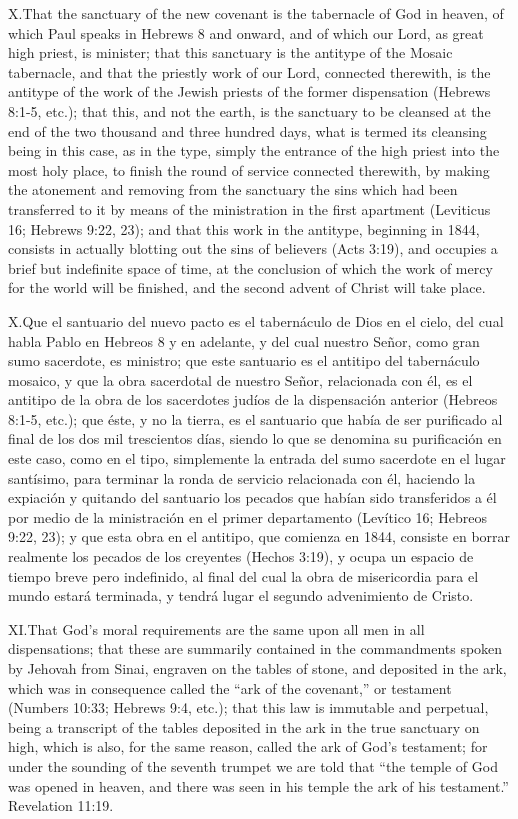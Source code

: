 \lettrine{X.} That the sanctuary of the new covenant is the tabernacle of God in heaven, of which Paul speaks in Hebrews 8 and onward, and of which our Lord, as great high priest, is minister; that this sanctuary is the antitype of the Mosaic tabernacle, and that the priestly work of our Lord, connected therewith, is the antitype of the work of the Jewish priests of the former dispensation (Hebrews 8:1-5, etc.); that this, and not the earth, is the sanctuary to be cleansed at the end of the two thousand and three hundred days, what is termed its cleansing being in this case, as in the type, simply the entrance of the high priest into the most holy place, to finish the round of service connected therewith, by making the atonement and removing from the sanctuary the sins which had been transferred to it by means of the ministration in the first apartment (Leviticus 16; Hebrews 9:22, 23); and that this work in the antitype, beginning in 1844, consists in actually blotting out the sins of believers (Acts 3:19), and occupies a brief but indefinite space of time, at the conclusion of which the work of mercy for the world will be finished, and the second advent of Christ will take place.


\lettrine{X.} Que el santuario del nuevo pacto es el tabernáculo de Dios en el cielo, del cual habla Pablo en Hebreos 8 y en adelante, y del cual nuestro Señor, como gran sumo sacerdote, es ministro; que este santuario es el antitipo del tabernáculo mosaico, y que la obra sacerdotal de nuestro Señor, relacionada con él, es el antitipo de la obra de los sacerdotes judíos de la dispensación anterior (Hebreos 8:1-5, etc.); que éste, y no la tierra, es el santuario que había de ser purificado al final de los dos mil trescientos días, siendo lo que se denomina su purificación en este caso, como en el tipo, simplemente la entrada del sumo sacerdote en el lugar santísimo, para terminar la ronda de servicio relacionada con él, haciendo la expiación y quitando del santuario los pecados que habían sido transferidos a él por medio de la ministración en el primer departamento (Levítico 16; Hebreos 9:22, 23); y que esta obra en el antitipo, que comienza en 1844, consiste en borrar realmente los pecados de los creyentes (Hechos 3:19), y ocupa un espacio de tiempo breve pero indefinido, al final del cual la obra de misericordia para el mundo estará terminada, y tendrá lugar el segundo advenimiento de Cristo.


\lettrine{XI.} That God’s moral requirements are the same upon all men in all dispensations; that these are summarily contained in the commandments spoken by Jehovah from Sinai, engraven on the tables of stone, and deposited in the ark, which was in consequence called the “ark of the covenant,” or testament (Numbers 10:33; Hebrews 9:4, etc.); that this law is immutable and perpetual, being a transcript of the tables deposited in the ark in the true sanctuary on high, which is also, for the same reason, called the ark of God’s testament; for under the sounding of the seventh trumpet we are told that “the temple of God was opened in heaven, and there was seen in his temple the ark of his testament.” Revelation 11:19.


